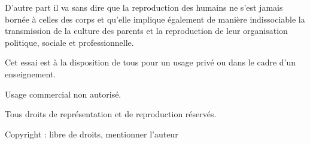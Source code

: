 D'autre part il va sans dire que la reproduction des humains ne s'est jamais bornée à celles des corps et qu'elle implique également de manière indissociable la transmission de la culture des parents et la reproduction de leur organisation politique, sociale et professionnelle. 



Cet essai est à la disposition de tous pour un usage privé ou dans le cadre d'un enseignement. 

Usage commercial non autorisé. 

Tous droits de représentation et de reproduction réservés.

Copyright : libre de droits, mentionner l'auteur








